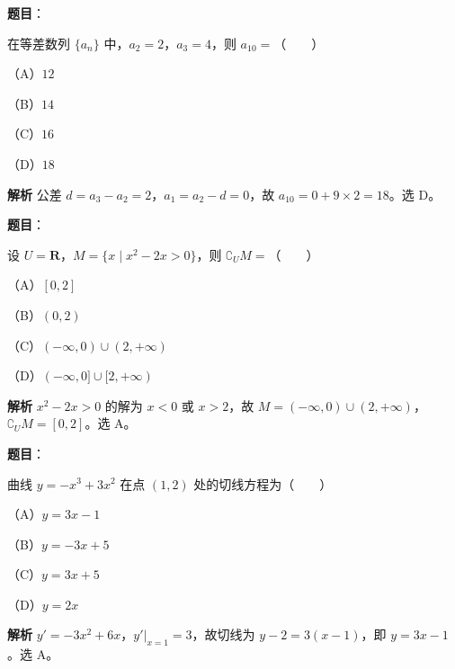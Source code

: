 
\begin{answer}

\textbf{题目}：

在等差数列 $\{a_n\}$ 中，$a_2=2$，$a_3=4$，则 $a_{10}=$\mbox{（　　）}

（A）$12$

（B）$14$

（C）$16$

（D）$18$

\textbf{解析}
公差 $d=a_3-a_2=2$，$a_1=a_2-d=0$，故 $a_{10}=0+9\times2=18$。选 D。


\end{answer}
\begin{answer}

\textbf{题目}：

设 $U=\mathbf R$，$M=\{x\mid x^2-2x>0\}$，则 $\complement_U M=$\mbox{（　　）}

（A）$[0,2]$

（B）$(0,2)$

（C）$(-\infty,0)\cup(2,+\infty)$

（D）$(-\infty,0]\cup[2,+\infty)$

\textbf{解析}
$x^2-2x>0$ 的解为 $x<0$ 或 $x>2$，故 $M=(-\infty,0)\cup(2,+\infty)$，$\complement_U M=[0,2]$。选 A。


\end{answer}
\begin{answer}

\textbf{题目}：

曲线 $y=-x^3+3x^2$ 在点 $(1,2)$ 处的切线方程为\mbox{（　　）}

（A）$y=3x-1$

（B）$y=-3x+5$

（C）$y=3x+5$

（D）$y=2x$

\textbf{解析}
$y'=-3x^2+6x$，$y'|_{x=1}=3$，故切线为 $y-2=3(x-1)$，即 $y=3x-1$。选 A。


\end{answer}
